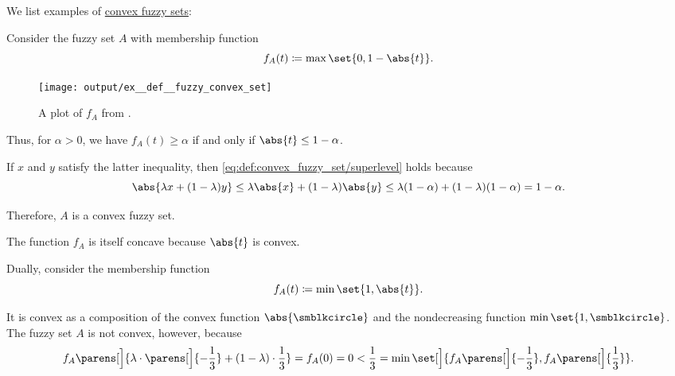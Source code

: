 \begin{example}\label{ex:def:convex_fuzzy_set}
  We list examples of \hyperref[def:convex_fuzzy_set]{convex fuzzy sets}:
  \begin{thmenum}
     Consider the fuzzy set \( A \) with membership function
    \begin{equation*}
      f_A(t) \coloneqq \max\set{ 0, 1 - \abs{t} }.
    \end{equation*}

    \begin{figure}[!ht]
      \centering
      \texttt{[image: output/ex\_\_def\_\_fuzzy\_convex\_set]}
      \caption{A plot of \( f_A \) from .}\label{fig:ex:def:convex_fuzzy_set/convex_set_not_convex_function}
    \end{figure}

    Thus, for \( \alpha > 0 \), we have \( f_A(t) \geq \alpha \) if and only if \( \abs{t} \leq 1 - \alpha \).

    If \( x \) and \( y \) satisfy the latter inequality, then \eqref{eq:def:convex_fuzzy_set/superlevel} holds because
    \begin{equation*}
      \abs{\lambda x + (1 - \lambda) y}
      \leq
      \lambda \abs{x} + (1 - \lambda) \abs{y}
      \leq
      \lambda (1 - \alpha) + (1 - \lambda) (1 - \alpha)
      =
      1 - \alpha.
    \end{equation*}

    Therefore, \( A \) is a convex fuzzy set.

    The function \( f_A \) is itself concave because \( \abs{t} \) is convex.

     Dually, consider the membership function
    \begin{equation*}
      f_A(t) \coloneqq \min\set{ 1, \abs{t} }.
    \end{equation*}

    It is convex as a composition of the convex function \( \abs{ \anon } \) and the nondecreasing function \( \min\set{ 1, \anon } \). The fuzzy set \( A \) is not convex, however, because
    \begin{equation*}
      f_A\parens[\Big]{ \lambda \cdot \parens[\Big]{ - \frac 1 3 } + (1 - \lambda) \cdot \frac 1 3 }
      =
      f_A(0)
      =
      0
      <
      \frac 1 3
      =
      \min\set[\Big]{ f_A\parens[\Big]{ -\frac 1 3 }, f_A\parens[\Big]{ \frac 1 3 } }.
    \end{equation*}
  \end{thmenum}
\end{example}

